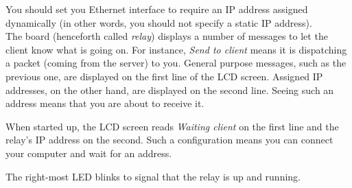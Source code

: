 You should set you Ethernet interface to require an IP address assigned dynamically (in other words, you should not specify a static IP address).\\

The board (henceforth called \textit{relay}) displays a number of messages to let the client know what is going on. For instance, \textit{Send to client} means it is dispatching a packet (coming from the server) to you. General purpose messages, such as the previous one, are displayed on the first line of the LCD screen. Assigned IP addresses, on the other hand, are displayed on the second line. Seeing such an address means that you are about to receive it.

When started up, the LCD screen reads \textit{Waiting client} on the first line and the relay's IP address on the second. Such a configuration means you can connect your computer and wait for an address.

The right-most LED blinks to signal that the relay is up and running.